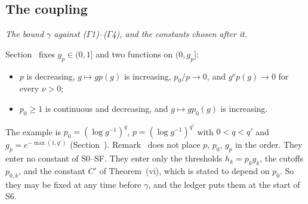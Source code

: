\subsection{The coupling}\label{subsec:ledger-coupling}

\begin{detail}\label{det:ledger-gamma}
\emph{The bound $\gamma$ against ($\Gamma$1)--($\Gamma$4), and the constants chosen after it.}

\begin{step}
Section~ fixes $g_p\in(0,1]$ and two functions on $(0,g_p]$:
\begin{itemize}
\item $p$ is decreasing, $g\mapsto gp(g)$ is increasing, $p_0/p\to0$, and $g^\nu p(g)\to0$ for every $\nu>0$;
\item $p_0\ge1$ is continuous and decreasing, and $g\mapsto gp_0(g)$ is increasing.
\end{itemize}
The example is $p_0=(\log g^{-1})^q$, $p=(\log g^{-1})^{q'}$ with $0<q<q'$ and $g_p=e^{-\max(1,q')}$ (Section~). Remark~ does not place $p$, $p_0$, $g_p$ in the order. They enter no constant of S0--SF. They enter only the thresholds $h_k=p_kg_k$, the cutoffs $p_{0,k}$, and the constant $C'$ of Theorem~(vi), which is stated to depend on $p_0$. So they may be fixed at any time before $\gamma$, and the ledger puts them at the start of S6.
\end{step}


\end{detail}
